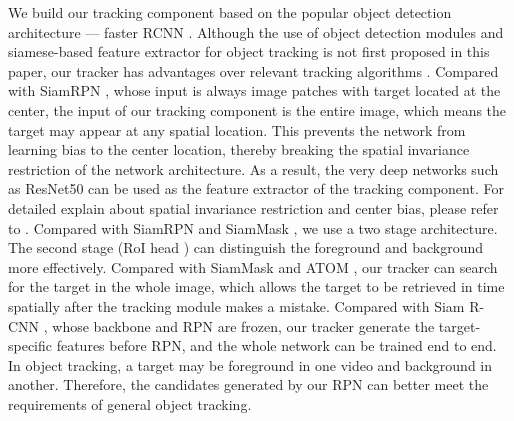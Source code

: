 We build our tracking component based on the popular object detection architecture --- faster RCNN \cite{ren2015faster}. Although the use of object detection modules and siamese-based feature extractor for object tracking is not first proposed in this paper, our tracker has advantages over relevant tracking algorithms \cite{li2018high, Wang2018SiamMask, danelljan2019atom, voigtlaender2019siam}. Compared with SiamRPN \cite{li2018high}, whose input is always image patches with target located at the center, the input of our tracking component is the entire image, which means the target may appear at any spatial location. This prevents the network from learning bias to the center location, thereby breaking the spatial invariance restriction \cite{li2019siamrpn++} of the network architecture. As a result, the very deep networks such as ResNet50 \cite{he2016deep} can be used as the feature extractor of the tracking component. For detailed explain about spatial invariance restriction and center bias, please refer to \cite{li2019siamrpn++}.
Compared with SiamRPN \cite{li2018high} and SiamMask \cite{Wang2018SiamMask}, we use a two stage architecture. The second stage (RoI head \cite{ren2015faster}) can distinguish the foreground and background more effectively.
Compared with SiamMask \cite{Wang2018SiamMask} and ATOM \cite{danelljan2019atom}, our tracker can search for the target in the whole image, which allows the target to be retrieved in time spatially after the tracking module makes a mistake.
Compared with Siam R-CNN \cite{voigtlaender2019siam}, whose backbone and RPN are frozen, our tracker generate the target-specific features before RPN, and the whole network can be trained end to end. In object tracking, a target may be foreground in one video and background in another. Therefore, the candidates generated by our RPN can better meet the requirements of general object tracking.

